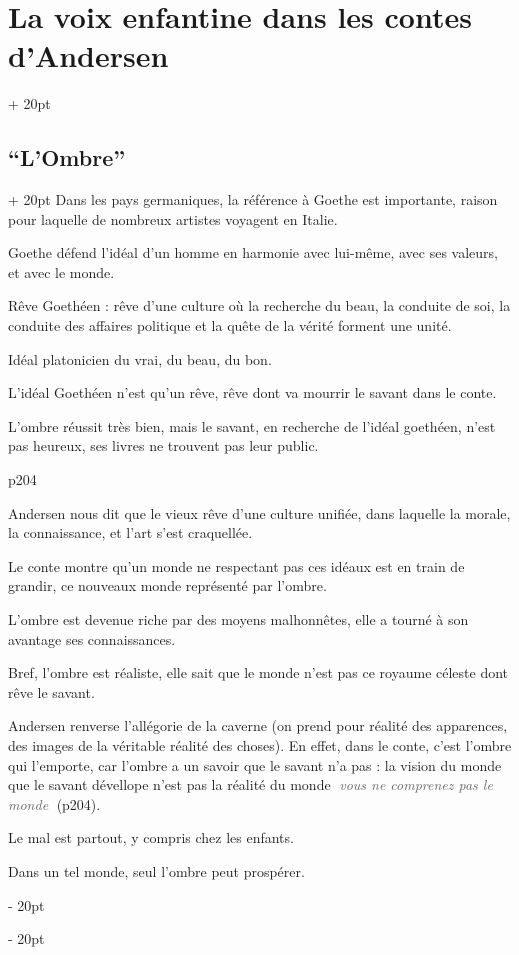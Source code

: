 \documentclass[a4paper, 12pt, twoside]{article}
\newcommand{\simplecit}[1]{\guillemotleft$\;$#1$\;$\guillemotright}
\newcommand{\cit}[1]{\simplecit{\textcolor{656565}{#1}}}
\newcommand{\quo}[1]{\cit{\it #1}}
\newcommand{\ind}[1][20pt]{\advance\leftskip + #1}
\newcommand{\deind}[1][20pt]{\advance\leftskip - #1}
\newenvironment{indt}[2][20pt]{#2 \par \ind[#1]}{\par \deind} %
\begin{document}
\begin{indt}{\section{La voix enfantine dans les contes d'Andersen}}
\begin{indt}{\subsection{``L'Ombre''}}
            Dans les pays germaniques, la référence à Goethe est importante, raison pour laquelle de nombreux artistes voyagent en Italie.
            
            Goethe défend l'idéal d'un homme en harmonie avec lui-même, avec ses valeurs, et avec le monde.
            
            Rêve Goethéen : rêve d'une culture où la recherche du beau, la conduite de soi, la conduite des affaires politique et la quête de la vérité forment une unité.
            
            Idéal platonicien du vrai, du beau, du bon.
            
            
            \vspace{12pt}
            
            L'idéal Goethéen n'est qu'un rêve, rêve dont va mourrir le savant dans le conte.
            
            L'ombre réussit très bien, mais le savant, en recherche de l'idéal goethéen, n'est pas heureux, ses livres ne trouvent pas leur public.
            
            p204
            
            Andersen nous dit que le vieux rêve d'une culture unifiée, dans laquelle la morale, la connaissance, et l'art s'est craquellée.
            
            Le conte montre qu'un monde ne respectant pas ces idéaux est en train de grandir, ce nouveaux monde représenté par l'ombre.
            
            L'ombre est devenue riche par des moyens malhonnêtes, elle a tourné à son avantage ses connaissances.
            
            Bref, l'ombre est réaliste, elle sait que le monde n'est pas ce royaume céleste dont rêve le savant.
            
            Andersen renverse l'allégorie de la caverne (on prend pour réalité des apparences, des images de la véritable réalité des choses). En effet, dans le conte, c'est l'ombre qui l'emporte, car l'ombre a un savoir que le savant n'a pas : la vision du monde que le savant dévellope n'est pas la réalité du monde \quo{vous ne comprenez pas le monde} (p204).
            
            Le mal est partout, y compris chez les enfants.
            
            Dans un tel monde, seul l'ombre peut prospérer.
            

\end{indt}
\end{indt}
\end{document}
